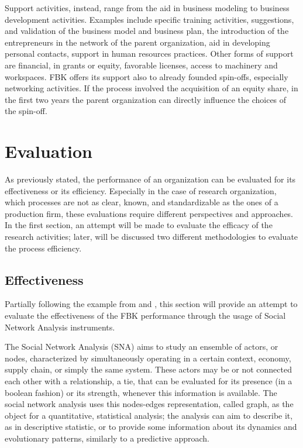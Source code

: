 Support activities, instead, range from the aid in business modeling to business development activities. Examples include specific training activities, suggestions, and validation of the business model and business plan, the introduction of the entrepreneurs in the network of the parent organization, aid in developing personal contacts, support in human resources practices. Other forms of support are financial, in grants or equity, favorable licenses, access to machinery and workspaces. FBK offers its support also to already founded spin-offs, especially networking activities. If the process involved the acquisition of an equity share, in the first two years the parent organization can directly influence the choices of the spin-off.



\section{Evaluation}

As previously stated, the performance of an organization can be evaluated for its effectiveness or its efficiency. Especially in the case of research organization, which processes are not as clear, known, and standardizable as the ones of a production firm, these evaluations require different perspectives and approaches. In the first section, an attempt will be made to evaluate the efficacy of the research activities; later, will be discussed two different methodologies to evaluate the process efficiency. 

\subsection{Effectiveness}

Partially following the example from \citet{Giuliani2005} and \citet{Cantner2006}, this section will provide an attempt to evaluate the effectiveness of the FBK performance through the usage of Social Network Analysis instruments. 

The Social Network Analysis (SNA) aims to study an ensemble of actors, or nodes, characterized by simultaneously operating in a certain context, economy, supply chain, or simply the same system. These actors may be or not connected each other with a relationship, a tie, that can be evaluated for its presence (in a boolean fashion) or its strength, whenever this information is available. The social network analysis uses this nodes-edges representation, called graph, as the object for a quantitative, statistical analysis; the analysis can aim to describe it, as in descriptive statistic, or to provide some information about its dynamics and evolutionary patterns, similarly to a predictive approach.


